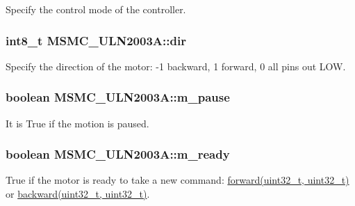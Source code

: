 Specify the control mode of the controller. 

\hypertarget{class_m_s_m_c___u_l_n2003_a_af8b9f054cc60da4bb45567f80c907b94}{
\subsubsection[{dir}]{\setlength{\rightskip}{0pt plus 5cm}int8\+\_\+t M\+S\+M\+C\+\_\+\+U\+L\+N2003\+A\+::dir\hspace{0.3cm}{\ttfamily [private]}}}\label{class_m_s_m_c___u_l_n2003_a_af8b9f054cc60da4bb45567f80c907b94}


Specify the direction of the motor\+: -\/1 backward, 1 forward, 0 all pins out L\+O\+W. 

\hypertarget{class_m_s_m_c___u_l_n2003_a_a6b0ddbdadf767fdc1d1c5f8a3ffd6f10}{
\subsubsection[{m\+\_\+pause}]{\setlength{\rightskip}{0pt plus 5cm}boolean M\+S\+M\+C\+\_\+\+U\+L\+N2003\+A\+::m\+\_\+pause\hspace{0.3cm}{\ttfamily [private]}}}\label{class_m_s_m_c___u_l_n2003_a_a6b0ddbdadf767fdc1d1c5f8a3ffd6f10}


It is True if the motion is paused. 

\hypertarget{class_m_s_m_c___u_l_n2003_a_a4f2ee51f769815847a2a0062ff03bd6e}{
\subsubsection[{m\+\_\+ready}]{\setlength{\rightskip}{0pt plus 5cm}boolean M\+S\+M\+C\+\_\+\+U\+L\+N2003\+A\+::m\+\_\+ready\hspace{0.3cm}{\ttfamily [private]}}}\label{class_m_s_m_c___u_l_n2003_a_a4f2ee51f769815847a2a0062ff03bd6e}


True if the motor is ready to take a new command\+: \hyperlink{class_m_s_m_c___u_l_n2003_a_a9657492f948a75472b311bc0b823899f}{forward(uint32\+\_\+t, uint32\+\_\+t)} or \hyperlink{class_m_s_m_c___u_l_n2003_a_ac46e6ec6345f95b534079bcf2920885e}{backward(uint32\+\_\+t, uint32\+\_\+t)}. 

